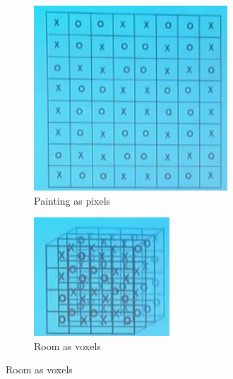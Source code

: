 \documentclass[]{article}
\begin{document}
\begin{figure}[H]
	\caption{Coding 2D and 3D information with bits.}
	\begin{subfigure}[t]{0.45\textwidth}
		\caption{Painting as pixels}
		\includegraphics[width=\textwidth]{wh-painting-pixels}
	\end{subfigure}
	\begin{subfigure}[t]{0.45\textwidth}
		\caption{Room as voxels}
		\includegraphics[width=\textwidth]{wh-voxels}
	\end{subfigure}
\end{figure}
\end{document}
